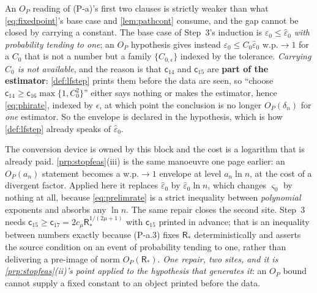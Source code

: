 \begin{remark}\label{rem:paenvelope}
An $O_P$ reading of (P-a)'s first two clauses is strictly weaker than what
\eqref{eq:fixedpoint}'s base case and \cref{lem:pathcont} consume, and the gap cannot be closed by
carrying a constant.
The base case of Step~3's induction is
$\varepsilon_0\le\hat\varepsilon_0$ \emph{with probability tending to one}; an $O_P$ hypothesis gives
instead $\varepsilon_0\le C_0\hat\varepsilon_0$ w.p.$\to1$ for a $C_0$ that is not a number but a family
$\{C_{0,\epsilon}\}$ indexed by the tolerance. \emph{Carrying $C_0$ is not available}, and the reason is
that $\mathsf c_{14}$ and $\mathsf c_{15}$ are \textbf{part of the estimator}: \cref{def:lfstep} prints
them before the data are seen, so ``choose $\mathsf c_{14}\ge\mathsf c_{16}\max\{1,C_0^{2}\}$'' either
says nothing or makes the estimator, hence \eqref{eq:phirate}, indexed by $\epsilon$, at which
point the conclusion is no longer $O_P(\delta_n)$ for \emph{one} estimator. So the envelope is
declared in the hypothesis, which is how \cref{def:lfstep} already speaks of $\hat\varepsilon_0$.

The conversion device is owned by this block and the cost is a logarithm that is already paid.
\cref{prp:stopfeas}(iii) is the same manoeuvre one page earlier: an $O_P(a_n)$ statement becomes a
w.p.$\to1$ envelope at level $a_n\ln n$, at the cost of a divergent factor. Applied here it replaces
$\hat\varepsilon_0$ by $\hat\varepsilon_0\ln n$, which changes $\varsigma_0$ by nothing at all, because
\eqref{eq:prelimrate} is a strict inequality between \emph{polynomial} exponents and absorbs any
$\ln n$. The same repair closes the second site. Step~3 needs
$\mathsf c_{15}\ge\mathsf c_{17}=2c_\mu\mathsf R_\ast^{1/(2\mu+1)}$ with $\mathsf c_{15}$ printed in
advance; that is an inequality between numbers exactly because (P-a.3) fixes $\mathsf R_\ast$
deterministically and asserts the source condition on an event of probability tending to one, rather than
delivering a pre-image of norm $O_P(\mathsf R_\ast)$. \emph{One repair, two sites, and it is
\cref{prp:stopfeas}(ii)'s point applied to the hypothesis that generates it}: an $O_P$ bound cannot
supply a fixed constant to an object printed before the data.


\end{remark}
